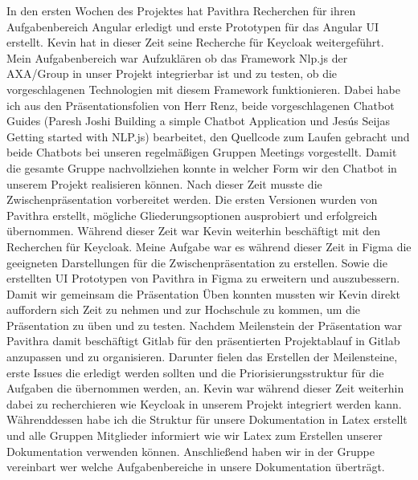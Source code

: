 \noindent In den ersten Wochen des Projektes hat Pavithra Recherchen für ihren Aufgabenbereich Angular erledigt und erste Prototypen für das Angular UI erstellt.
Kevin hat in dieser Zeit seine Recherche für Keycloak weitergeführt.
Mein Aufgabenbereich war Aufzuklären ob das Framework Nlp.js der AXA/Group in unser Projekt integrierbar ist und zu testen,
ob die vorgeschlagenen Technologien mit diesem Framework funktionieren.
Dabei habe ich aus den Präsentationsfolien von Herr Renz,
beide vorgeschlagenen Chatbot Guides (Paresh Joshi Building a simple Chatbot Application und Jesús Seijas Getting started with NLP.js)
bearbeitet, den Quellcode zum Laufen gebracht und beide Chatbots bei unseren regelmäßigen Gruppen Meetings vorgestellt.
Damit die gesamte Gruppe nachvollziehen konnte in welcher Form wir den Chatbot in unserem Projekt realisieren können.
Nach dieser Zeit musste die Zwischenpräsentation vorbereitet werden.
Die ersten Versionen wurden von Pavithra erstellt, mögliche Gliederungsoptionen ausprobiert und erfolgreich übernommen.
Während dieser Zeit war Kevin weiterhin beschäftigt mit den Recherchen für Keycloak.
Meine Aufgabe war es während dieser Zeit in Figma die geeigneten Darstellungen für die Zwischenpräsentation zu erstellen.
Sowie die erstellten UI Prototypen von Pavithra in Figma zu erweitern und auszubessern.
Damit wir gemeinsam die Präsentation Üben konnten mussten wir Kevin direkt auffordern sich Zeit zu nehmen und zur Hochschule zu kommen,
um die Präsentation zu üben und zu testen.
Nachdem Meilenstein der Präsentation war Pavithra damit beschäftigt Gitlab für den präsentierten Projektablauf in Gitlab anzupassen und zu organisieren.
Darunter fielen das Erstellen der Meilensteine, erste Issues die erledigt werden sollten und die Priorisierungsstruktur für die Aufgaben die übernommen werden, an.
Kevin war während dieser Zeit weiterhin dabei zu recherchieren wie Keycloak in unserem Projekt integriert werden kann.
Währenddessen habe ich die Struktur für unsere Dokumentation in Latex erstellt und alle Gruppen Mitglieder informiert wie wir Latex zum Erstellen unserer Dokumentation verwenden können.
Anschließend haben wir in der Gruppe vereinbart wer welche Aufgabenbereiche in unsere Dokumentation überträgt.

